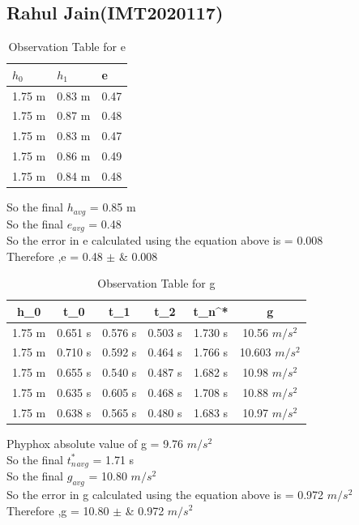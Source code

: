 \documentclass[11pt]{scrartcl} %
\begin{document}
\subsection{Rahul Jain(IMT2020117)}

\begin{table}[h] %
	\centering %
	\begin{tabular}{l l l}
		\toprule
		\textbf{$h_0$} & \textbf{$h_1$} & \textbf{e} \\
		\midrule
		1.75 m & 0.83 m & 0.47\\
        1.75 m & 0.87 m  & 0.48\\
        1.75 m & 0.83 m  & 0.47\\
        1.75 m & 0.86 m & 0.49 \\
        1.75 m & 0.84 m & 0.48 \\
		\bottomrule
	\end{tabular}
	\caption{Observation Table for e}
\end{table}
So the final $h_{avg}$ = 0.85 m\\
So the final $e_{avg}$ = 0.48\\
So the error in e calculated using the equation above is  = 0.008\\
Therefore ,e = 0.48  $\pm$ &  0.008 \\

\begin{table}[h]
\centering
\begin{tabular}{||c c c c c c||} 
\toprule
 \hline
 h_0 & t_0 & t_1 & t_2 & t_n^* & g \\ [0.5ex] 
 \midrule
 \hline\hline
1.75 m & 0.651 s & 0.576 s  & 0.503 s & 1.730 s & 10.56 $m/s^2$  \\ 
 \hline
 1.75 m & 0.710 s & 0.592 s & 0.464 s & 1.766 s & 10.603 $m/s^2$  \\
 \hline
 1.75 m & 0.655 s & 0.540 s & 0.487 s & 1.682 s  & 10.98 $m/s^2$   \\
 \hline
 1.75 m & 0.635 s & 0.605 s & 0.468 s & 1.708 s  & 10.88 $m/s^2$   \\
 \hline
 1.75 m & 0.638 s & 0.565 s & 0.480 s & 1.683 s  & 10.97 $m/s^2$  \\ [1ex]
 \bottomrule
 \hline
\end{tabular}
\caption{Observation Table for g}
\end{table}
Phyphox absolute value of g = 9.76 $m/s^2$\\
So the final $t_n^*_{avg}$ = 1.71 s\\
So the final $g_{avg}$ = 10.80 $m/s^2$\\
So the error in g calculated using the equation above is  = 0.972 $m/s^2$ \\
Therefore ,g = 10.80  $\pm$ &  0.972 $m/s^2$ \\
\newpage
\end{document}
